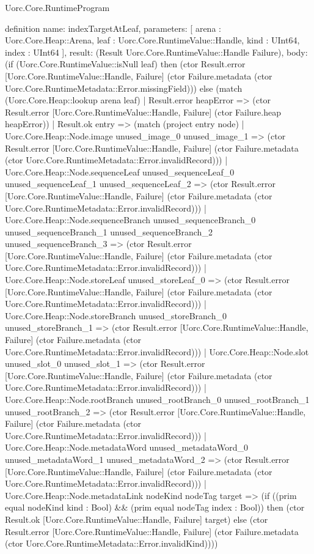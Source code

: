 \begin{lexlean}{Uorc.Core.RuntimeProgram}
\begin{semanticmodule}
definition{
  name: indexTargetAtLeaf,
  parameters: [
    arena : Uorc.Core.Heap::Arena,
    leaf : Uorc.Core.RuntimeValue::Handle,
    kind : UInt64,
    index : UInt64
  ],
  result: (Result Uorc.Core.RuntimeValue::Handle Failure),
  body: (if (Uorc.Core.RuntimeValue::isNull leaf) then (ctor Result.error [Uorc.Core.RuntimeValue::Handle, Failure] (ctor Failure.metadata (ctor Uorc.Core.RuntimeMetadata::Error.missingField))) else (match (Uorc.Core.Heap::lookup arena leaf)
    | Result.error heapError => (ctor Result.error [Uorc.Core.RuntimeValue::Handle, Failure] (ctor Failure.heap heapError))
    | Result.ok entry => (match (project entry node)
      | Uorc.Core.Heap::Node.image unused_image_0 unused_image_1 => (ctor Result.error [Uorc.Core.RuntimeValue::Handle, Failure] (ctor Failure.metadata (ctor Uorc.Core.RuntimeMetadata::Error.invalidRecord)))
      | Uorc.Core.Heap::Node.sequenceLeaf unused_sequenceLeaf_0 unused_sequenceLeaf_1 unused_sequenceLeaf_2 => (ctor Result.error [Uorc.Core.RuntimeValue::Handle, Failure] (ctor Failure.metadata (ctor Uorc.Core.RuntimeMetadata::Error.invalidRecord)))
      | Uorc.Core.Heap::Node.sequenceBranch unused_sequenceBranch_0 unused_sequenceBranch_1 unused_sequenceBranch_2 unused_sequenceBranch_3 => (ctor Result.error [Uorc.Core.RuntimeValue::Handle, Failure] (ctor Failure.metadata (ctor Uorc.Core.RuntimeMetadata::Error.invalidRecord)))
      | Uorc.Core.Heap::Node.storeLeaf unused_storeLeaf_0 => (ctor Result.error [Uorc.Core.RuntimeValue::Handle, Failure] (ctor Failure.metadata (ctor Uorc.Core.RuntimeMetadata::Error.invalidRecord)))
      | Uorc.Core.Heap::Node.storeBranch unused_storeBranch_0 unused_storeBranch_1 => (ctor Result.error [Uorc.Core.RuntimeValue::Handle, Failure] (ctor Failure.metadata (ctor Uorc.Core.RuntimeMetadata::Error.invalidRecord)))
      | Uorc.Core.Heap::Node.slot unused_slot_0 unused_slot_1 => (ctor Result.error [Uorc.Core.RuntimeValue::Handle, Failure] (ctor Failure.metadata (ctor Uorc.Core.RuntimeMetadata::Error.invalidRecord)))
      | Uorc.Core.Heap::Node.rootBranch unused_rootBranch_0 unused_rootBranch_1 unused_rootBranch_2 => (ctor Result.error [Uorc.Core.RuntimeValue::Handle, Failure] (ctor Failure.metadata (ctor Uorc.Core.RuntimeMetadata::Error.invalidRecord)))
      | Uorc.Core.Heap::Node.metadataWord unused_metadataWord_0 unused_metadataWord_1 unused_metadataWord_2 => (ctor Result.error [Uorc.Core.RuntimeValue::Handle, Failure] (ctor Failure.metadata (ctor Uorc.Core.RuntimeMetadata::Error.invalidRecord)))
      | Uorc.Core.Heap::Node.metadataLink nodeKind nodeTag target => (if ((prim equal nodeKind kind : Bool) && (prim equal nodeTag index : Bool)) then (ctor Result.ok [Uorc.Core.RuntimeValue::Handle, Failure] target) else (ctor Result.error [Uorc.Core.RuntimeValue::Handle, Failure] (ctor Failure.metadata (ctor Uorc.Core.RuntimeMetadata::Error.invalidKind))))
}
\end{semanticmodule}
\end{lexlean}
